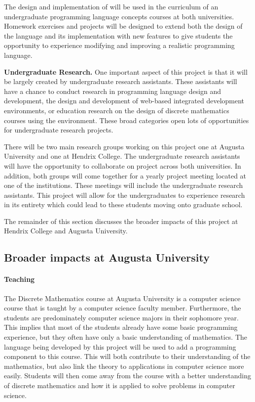 The design and implementation of \thelang{} will be used in the
curriculum of an undergraduate programming language concepts courses
at both universities.  Homework exercises and projects will be
designed to extend both the design of the language and its
implementation with new features to give students the opportunity to
experience modifying and improving a realistic programming language.

\textbf{Undergraduate Research.} One important aspect of this project
is that it will be largely created by undergraduate research
assistants.  These assistants will have a chance to conduct research
in programming language design and development, the design and
development of web-based integrated development environments, or
education research on the design of discrete mathematics courses using
the \thelang{} environment.  These broad categories open lots of
opportunities for undergraduate research projects.

There will be two main research groups working on this project one at
Augusta University and one at Hendrix College.  The undergraduate
research assistants will have the opportunity to collaborate on
project across both universities.  In addition, both groups will come
together for a yearly project meeting located at one of the
institutions.  These meetings will include the undergraduate research
assistants.  This project will allow for the undergraduates to
experience research in its entirety which could lead to these students
moving onto graduate school.

The remainder of this section discusses the broader impacts of this
project at Hendrix College and Augusta University.

\subsection{Broader impacts at Augusta University}
\label{subsec:broader_impacts_at_augusta_university}

\paragraph{Teaching}  The Discrete Mathematics course at Augusta
University is a computer science course that is taught by a computer
science faculty member.  Furthermore, the students are predominately
computer science majors in their sophomore year.  This implies that
most of the students already have some basic programming experience,
but they often have only a basic understanding of mathematics.  The
language being developed by this project will be used to add a
programming component to this course.  This will both contribute to
their understanding of the mathematics, but also link the theory to
applications in computer science more easily.  Students will then come
away from the course with a better understanding of discrete
mathematics and how it is applied to solve problems in computer
science.

